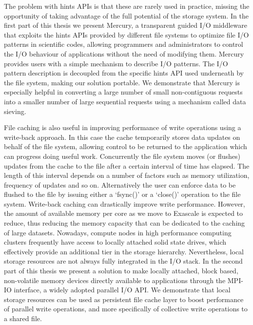 \documentclass[a4paper,titlepage,oneside,11pt]{book}
\begin{document}
The problem with hints APIs is that these are rarely used in practice, missing the opportunity of taking advantage of the full potential of the storage system. 
In the first part of this thesis we present Mercury, a transparent guided I/O middleware that exploits the hints APIs provided by different file systems to optimize file I/O patterns in scientific codes, allowing programmers and 
administrators to control the I/O behaviour of applications without the need of modifying them. Mercury provides users with a simple mechanism to describe I/O patterns. The I/O pattern description is decoupled from the specific
hints API used underneath by the file system, making our solution portable. We demonstrate that Mercury is especially helpful in converting a large number of small non-contiguous requests into a smaller number of large sequential 
requests using a mechanism called data sieving.

\vspace{5mm}
File caching is also useful in improving performance of write operations using a write-back approach. In this case the cache temporarily stores data updates on behalf of the file system, allowing control to be returned to the 
application which can progress doing useful work. Concurrently the file system moves (or flushes) updates from the cache to the file after a certain interval of time has elapsed. The length of this interval depends on a number of factors 
such as memory utilization, frequency of updates and so on. Alternatively the user can enforce data to be flushed to the file by issuing either a `fsync()' or a `close()' operation to the file system.
Write-back caching can drastically improve write performance. However, the amount of available memory per core as we move to Exascale is expected to reduce, thus reducing the memory capacity that can be dedicated to the caching of large datasets.
Nowadays, compute nodes in high performance computing clusters frequently have access to locally attached solid state drives, which effectively provide an additional tier in the storage hierarchy. Nevertheless, local storage resources 
are not always fully integrated in the I/O stack. In the second part of this thesis we present a solution to make locally attached, block based, non-volatile memory devices directly available to applications through the MPI-IO interface, 
a widely adopted parallel I/O API. We demonstrate that local storage resources can be used as persistent file cache layer to boost performance of parallel write operations, and more specifically of collective write operations to 
a shared file.
\newpage
\end{document}

